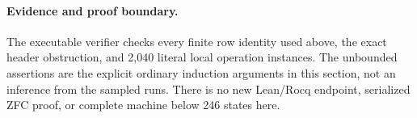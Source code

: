 \paragraph{Evidence and proof boundary.}
The executable verifier checks every finite row identity used above, the
exact header obstruction, and 2,040 literal local operation instances. The
unbounded assertions are the explicit ordinary induction arguments in this
section, not an inference from the sampled runs. There is no new Lean/Rocq
endpoint, serialized ZFC proof, or complete machine below 246 states here.
